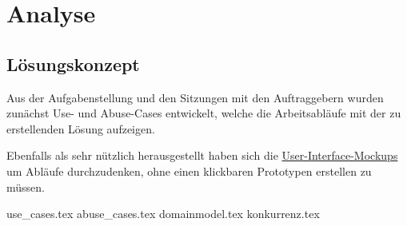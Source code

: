 \chapter{Analyse}
\section{Lösungskonzept}

Aus der Aufgabenstellung und den Sitzungen mit den Auftraggebern wurden zunächst Use- und Abuse-Cases entwickelt, welche die Arbeitsabläufe mit der zu erstellenden Lösung aufzeigen.

Ebenfalls als sehr nützlich herausgestellt haben sich die \hyperref[design:mockups]{User-Interface-Mockups} um Abläufe durchzudenken, ohne einen klickbaren Prototypen erstellen zu müssen.

\clearpage
{use_cases.tex}
\clearpage
{abuse_cases.tex}
\clearpage
{domainmodel.tex}
\clearpage
{konkurrenz.tex}

